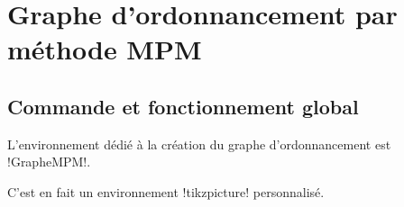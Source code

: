 \documentclass[french,a4paper,11pt]{article}
\begin{document}
{{\begin{DemoCode}[]
\end{DemoCode}

\begin{DemoCode}[]
\end{DemoCode}

\begin{DemoCode}[]
\textsf{}
\end{DemoCode}

\begin{DemoCode}[]
\texttt{}
\end{DemoCode}

\begin{DemoCode}[]
\texttt{}
\end{DemoCode}

\begin{DemoCode}[]
\textsf{}
\end{DemoCode}

\begin{DemoCode}[]
{\Huge\ttfamily{}}
\end{DemoCode}

\pagebreak

\section{Graphe d'ordonnancement par méthode MPM}

\subsection{Commande et fonctionnement global}

\begin{cautionblock}
L'environnement dédié à la création du graphe d'ordonnancement est \motcletex!GrapheMPM!.

C'est en fait un environnement \motcletex!tikzpicture! personnalisé.

\smallskip


\end{cautionblock}}}
\end{document}
